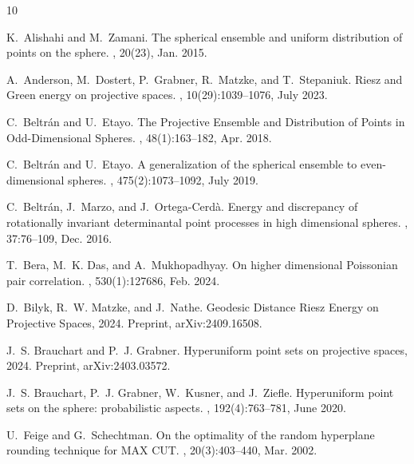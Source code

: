 \documentclass[a4paper,11pt]{amsart}
\begin{document}
\begin{thebibliography}{10}

K.~Alishahi and M.~Zamani.
\newblock The spherical ensemble and uniform distribution of points on the sphere.
, 20(23), Jan. 2015.

A.~Anderson, M.~Dostert, P.~Grabner, R.~Matzke, and T.~Stepaniuk.
\newblock Riesz and {G}reen energy on projective spaces.
, 10(29):1039–1076, July 2023.

C.~Beltrán and U.~Etayo.
\newblock The {P}rojective {E}nsemble and {D}istribution of {P}oints in {O}dd-{D}imensional {S}pheres.
, 48(1):163–182, Apr. 2018.

C.~Beltrán and U.~Etayo.
\newblock A generalization of the spherical ensemble to even-dimensional spheres.
, 475(2):1073–1092, July 2019.

C.~Beltrán, J.~Marzo, and J.~Ortega-Cerdà.
\newblock Energy and discrepancy of rotationally invariant determinantal point processes in high dimensional spheres.
, 37:76–109, Dec. 2016.

T.~Bera, M.~K. Das, and A.~Mukhopadhyay.
\newblock On higher dimensional {P}oissonian pair correlation.
, 530(1):127686, Feb. 2024.

D.~Bilyk, R.~W. Matzke, and J.~Nathe.
\newblock Geodesic {D}istance {R}iesz {E}nergy on {P}rojective {S}paces, 2024.
\newblock Preprint,  arXiv:2409.16508. 

J.~S. Brauchart and P.~J. Grabner.
\newblock Hyperuniform point sets on projective spaces, 2024.
\newblock Preprint,  arXiv:2403.03572.

J.~S. Brauchart, P.~J. Grabner, W.~Kusner, and J.~Ziefle.
\newblock Hyperuniform point sets on the sphere: probabilistic aspects.
, 192(4):763–781, June 2020.

U.~Feige and G.~Schechtman.
\newblock On the optimality of the random hyperplane rounding technique for {MAX} {CUT}.
, 20(3):403–440, Mar. 2002.


\end{thebibliography}
\end{document}
